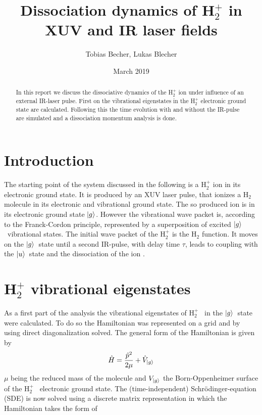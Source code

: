 \documentclass[12pt]{article}
\title{Dissociation dynamics of H$_2^+$ in XUV and IR laser fields}
\author{Tobias Becher, Lukas Blecher}
\date{March 2019}
\newcommand{\hp}{H$_2^+$ }
\newcommand{\gr}{$\ket{g}$}
\newcommand{\us}{$\ket{u}$}
\begin{document}


\maketitle
\begin{abstract}
In this report we discuss the dissociative dynamics of the \hp ion under influence of an external IR-laser pulse. First on the vibrational eigenstates in the \hp electronic ground state are calculated. Following this the time evolution with and without the IR-pulse are simulated and a dissociation momentum analysis is done. 
\end{abstract}


\section{Introduction}
The starting point of the system discussed in the following is a \hp  ion in its electronic ground state. It is produced by an XUV laser pulse, that ionizes a H$_2$ molecule in its electronic and vibrational ground state. The so produced ion is in its electronic ground state \gr. However the vibrational wave packet is, according to the Franck-Cordon principle, represented by a superposition of excited \gr \ vibrational states. The initial wave packet of the \hp is the H$_2$ function. It moves on the \gr \ state until a second IR-pulse, with delay time $\tau$, leads to coupling with the \us \ state and the dissociation of the ion \cite{PhysRevA.93.012507,c107696046f943e78de27c893d23ac2f}.
\section{H$_2^+$ vibrational eigenstates}
As a first part of the analysis the vibrational eigenstates of \hp\ in the 
\gr\ state were calculated. To do so the Hamiltonian was represented on a grid and by using direct diagonalization solved.
The general form of the Hamiltonian is given by 
\begin{equation}\label{eqn:generalHamiltonian}
    \hat{H}=\frac{\hat{p}^2}{2\mu}+\hat{V}_{\ket{g}}
\end{equation}
$\mu$ being the reduced mass of the molecule and $V_{\ket{g}}$ the Born-Oppenheimer surface of the \hp\ electronic ground state.
The (time-independent) Schr\"odinger-equation (SDE) is now solved using a discrete matrix representation in which the Hamiltonian takes the form of
\end{document}
